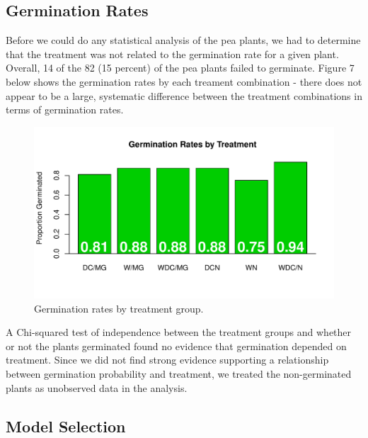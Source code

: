 \documentclass[1p,12pt]{elsarticle}\usepackage[]{graphicx}\usepackage[]{color}
\makeatletter
\def\maxwidth{ %
  \ifdim\Gin@nat@width>\linewidth
    \linewidth
  \else
    \Gin@nat@width
  \fi
}
\newenvironment{knitrout}{}{} %
\makeatother
\begin{document}
\subsection{Germination Rates}
Before we could do any statistical analysis of the pea plants, we had to determine that the treatment was not related to the germination rate for a given plant. Overall, 14 of the 82 (15 percent) of the pea plants failed to germinate. Figure 7 below shows the germination rates by each treament combination - there does not appear to be a large, systematic difference between the treatment combinations in terms of germination rates. 

\begin{knitrout}
\color{fgcolor}\begin{figure}
\includegraphics[width=\maxwidth]{figure/germination_rates-1} \caption[Germination rates by treatment group]{Germination rates by treatment group.}\label{fig:germination_rates}
\end{figure}


\end{knitrout}

A Chi-squared test of independence between the treatment groups and whether or not the plants germinated found no evidence that germination depended on treatment.  Since we did not find strong evidence supporting a relationship between germination probability and treatment, we treated the non-germinated plants as unobserved data in the analysis. 



\subsection{Model Selection}
\end{document}
